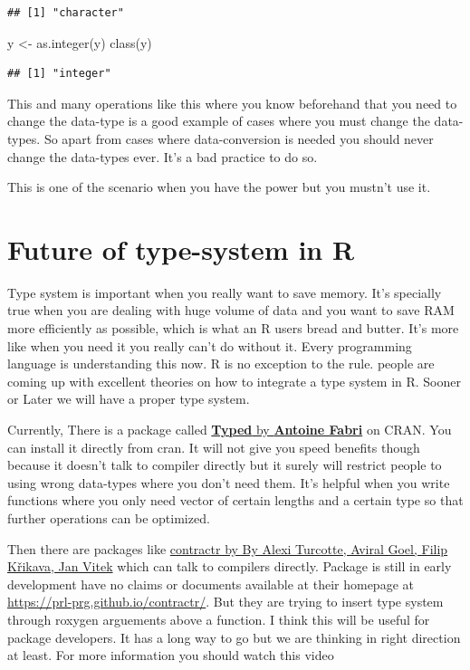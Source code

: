 \documentclass[
]{book}
\newenvironment{Shaded}{\begin{snugshade}}{\end{snugshade}}
\newcommand{\FunctionTok}[1]{\textcolor[rgb]{0.00,0.00,0.00}{#1}}
\newcommand{\NormalTok}[1]{#1}
\newcommand{\OtherTok}[1]{\textcolor[rgb]{0.56,0.35,0.01}{#1}}
\begin{document}
\begin{verbatim}
## [1] "character"
\end{verbatim}

\begin{Shaded}
\begin{Highlighting}[]
\NormalTok{y }\OtherTok{\textless{}{-}} \FunctionTok{as.integer}\NormalTok{(y)}
\FunctionTok{class}\NormalTok{(y)}
\end{Highlighting}
\end{Shaded}

\begin{verbatim}
## [1] "integer"
\end{verbatim}

This and many operations like this where you know beforehand that you need to change the data-type is a good example of cases where you must change the data-types. So apart from cases where data-conversion is needed you should never change the data-types ever. It's a bad practice to do so.

This is one of the scenario when you have the power but you mustn't use it.

\hypertarget{future-of-type-system-in-r}{%
\section{Future of type-system in R}\label{future-of-type-system-in-r}}

Type system is important when you really want to save memory. It's specially true when you are dealing with huge volume of data and you want to save RAM more efficiently as possible, which is what an R users bread and butter. It's more like when you need it you really can't do without it. Every programming language is understanding this now. R is no exception to the rule. people are coming up with excellent theories on how to integrate a type system in R. Sooner or Later we will have a proper type system.

Currently, There is a package called \href{https://github.com/moodymudskipper/typed}{\textbf{Typed} by \textbf{Antoine Fabri}} on CRAN. You can install it directly from cran. It will not give you speed benefits though because it doesn't talk to compiler directly but it surely will restrict people to using wrong data-types where you don't need them. It's helpful when you write functions where you only need vector of certain lengths and a certain type so that further operations can be optimized.

Then there are packages like \href{https://github.com/PRL-PRG/contractr}{contractr by By Alexi Turcotte, Aviral Goel, Filip Křikava, Jan Vitek} which can talk to compilers directly. Package is still in early development have no claims or documents available at their homepage at \url{https://prl-prg.github.io/contractr/}. But they are trying to insert type system through roxygen arguements above a function. I think this will be useful for package developers. It has a long way to go but we are thinking in right direction at least. For more information you should watch this video
\end{document}
